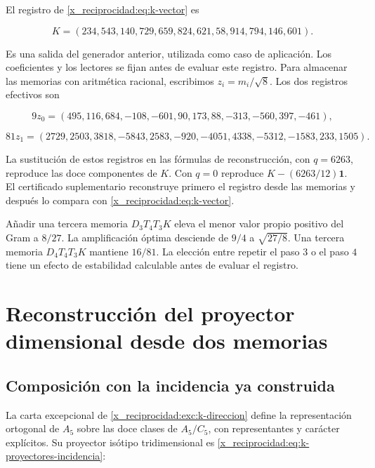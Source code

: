 El registro de \eqref{x_reciprocidad:eq:k-vector} es



\begin{equation}
K=(234,543,140,729,659,824,621,58,914,794,146,601).
\label{x_reciprocidad:nuc11:eq:10}
\end{equation}



Es una salida del generador anterior, utilizada como caso de
aplicación. Los coeficientes y los lectores se fijan antes de
evaluar este registro. Para almacenar las memorias con aritmética
racional, escribimos \(z_i=m_i/\sqrt8\).
Los dos registros efectivos son



\[
9z_0=(495,116,684,-108,-601,90,173,88,-313,-560,397,-461),
\]





\begin{equation}
81z_1=(2729,2503,3818,-5843,2583,-920,-4051,4338,-5312,-1583,233,1505).
\label{x_reciprocidad:nuc11:eq:11}
\end{equation}



La sustitución de estos registros en las fórmulas de reconstrucción,
con \(q=6263\), reproduce las doce componentes de \(K\).
Con \(q=0\) reproduce \(K-(6263/12)\mathbf1\).
El certificado suplementario reconstruye primero el registro desde
las memorias y después lo compara con \eqref{x_reciprocidad:eq:k-vector}.

Añadir una tercera memoria \(D_3T_4T_3K\) eleva el menor valor
propio positivo del Gram a \(8/27\).
La amplificación óptima desciende de \(9/4\) a \(\sqrt{27/8}\).
Una tercera memoria \(D_4T_4T_3K\) mantiene \(16/81\).
La elección entre repetir el paso \(3\) o el paso \(4\) tiene
un efecto de estabilidad calculable antes de evaluar el registro.

\section{Reconstrucción del proyector dimensional desde dos memorias}

\subsection{Composición con la incidencia ya construida}

La carta excepcional de \cref{x_reciprocidad:exc:k-direccion} define la
representación ortogonal de \(A_5\) sobre las doce clases de
\(A_5/C_5\), con representantes y carácter explícitos.
Su proyector isótipo tridimensional es
\eqref{x_reciprocidad:eq:k-proyectores-incidencia}:



